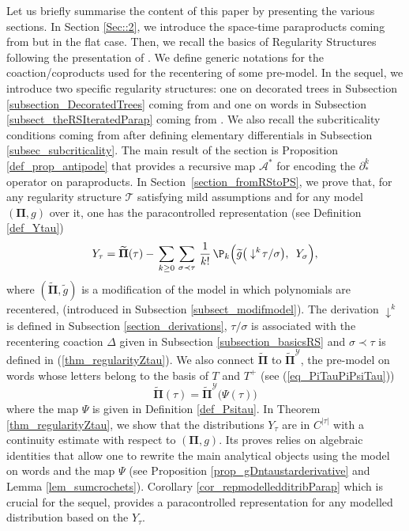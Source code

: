 \documentclass[11pt]{preprint}
\def\CA{\mathcal{A}}
\newcommand{\mcY}{\mathcal{Y}}
\def\PPi{\boldsymbol{\Pi}}
\def\eqref#1{(\ref{#1})}
\newcommand{\scrT}{\mathscr{T}}
\begin{document}
Let us briefly summarise the content of this paper by presenting the various sections. In Section \ref{Sec::2}, we introduce the space-time paraproducts coming from \cite{SpacetimeParaproducts} but in the flat case. Then, we recall the basics of Regularity Structures following the presentation of \cite{BH26}. We define generic notations for the coaction/coproducts used for the recentering of some pre-model. In the sequel, we introduce two specific regularity structures: one on decorated trees in Subsection \ref{subsection_DecoratedTrees} coming from \cite{Hai14,BHZ} and one on words in Subsection \ref{subsect_theRSIteratedParap} coming from \cite{BM26}.
We also recall the subcriticality conditions coming from \cite{BHZ} after defining elementary differentials in Subsection \ref{subsec_subcriticality}. The main result of the section is Proposition \ref{def_prop_antipode} that provides a recursive map $\CA^*$ for encoding the $\partial_*^k$ operator on paraproducts. 	In Section~\ref{section_fromRStoPS}, we prove that, for any regularity structure $\scrT$ satisfying mild assumptions and for any model  ${ (\PPi,g)}$ over it, one has the paracontrolled representation (see Definition \ref{def_Ytau})
	$$
 Y_{\tau} = \widetilde{ \PPi}(\tau) - \, \sum_{k\geq 0} \, \sum_{\sigma\prec \tau} \, \frac{1}{k!} \, \P_k\Big( \widetilde{ g}\big(\downarrow^k\hspace{-2pt} \tau/\sigma\big) , \enskip Y_\sigma  \Big),
	$$
	where $(\widetilde{\PPi},\widetilde{g})$ is a modification of the model in which polynomials are recentered, (introduced in Subsection \ref{subsect_modifmodel}). The derivation $ \downarrow^k $ is defined in Subsection	\ref{section_derivations}, $ \tau / \sigma $ is associated with the recentering coaction $\Delta$ given in Subsection \ref{subsection_basicsRS} and $\sigma \prec \tau$ is defined in \eqref{thm_regularityZtau}. We also connect $ \widetilde{\PPi} $ to $\widetilde{\PPi}^{\mathcal{Y}}$, the pre-model on words whose letters belong to the basis of $T$ and $T^{+}$ (see \eqref{eq_PiTauPiPsiTau})
	\begin{equation*}
		\widetilde{\PPi}(\tau) = 	\widetilde{\PPi}^\mcY\big(\Psi(\tau)\big)
	\end{equation*}
	where the map $\Psi$ is given in Definition \ref{def_Psitau}.
	 In Theorem \ref{thm_regularityZtau}, we show that the distributions $Y_\tau$ are in $C^{|\tau|}$ with a continuity estimate with respect to $(\PPi,g)$. Its proves relies on algebraic identities that allow one to rewrite the main analytical objects using the model on words and the map $\Psi$ (see Proposition \ref{prop_gDntaustarderivative} and Lemma \ref{lem_sumcrochets}). Corollary \ref{cor_repmodelledditribParap} which is  crucial for the sequel,
	 provides a paracontrolled representation for any modelled distribution based on the $Y_\tau$.
	 
\end{document}
